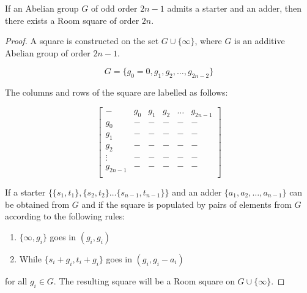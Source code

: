 \begin{theorem}
\label{thm:starter-adder}
If an Abelian group $G$ of odd order $2n - 1$ admits a starter and an adder, then there exists a Room square of order $2n$.
\end{theorem}

\begin{proof}
A square is constructed on the set $G \cup \{\infty\}$, where $G$ is an additive Abelian group of order $2n-1$.

\begin{equation}
G = \{g_0 = 0, g_1, g_2, \ldots, g_{2n-2}\}
\end{equation}

The columns and rows of the square are labelled as follows:

\begin{equation}
  \begin{bmatrix}
        -      & g_0  &  g_1  &  g_2  & \ldots &  g_{2n - 1} \\
       g_0     &   -  &   -   &   -   &    -   &     -       \\
       g_1     &   -  &   -   &   -   &    -   &     -       \\
       g_2     &   -  &   -   &   -   &    -   &     -       \\
     \vdots    &   -  &   -   &   -   &    -   &     -       \\
    g_{2n - 1} &   -  &   -   &   -   &    -   &     -       \\
  \end{bmatrix}
\end{equation}

If a starter
$\{\{s_1, t_1\}, \{s_2, t_2\} \ldots \{s_{n - 1}, t_{n - 1}\}\}$
and an adder
$\{a_1, a_2, \ldots, a_{n - 1}\}$
can be obtained from $G$ and if the square is populated by pairs of elements from $G$ according to the following rules:

\begin{enumerate}
  \item{$\{\infty, g_i\}$ goes in $(g_i, g_i)$}
  \item{While $\{s_i + g_i, t_i + g_i\}$ goes in $(g_i, g_i - a_i)$}
\end{enumerate}

for all $g_i \in G$.
The resulting square will be a Room square on $G \cup \{\infty\}$.


\end{proof}
